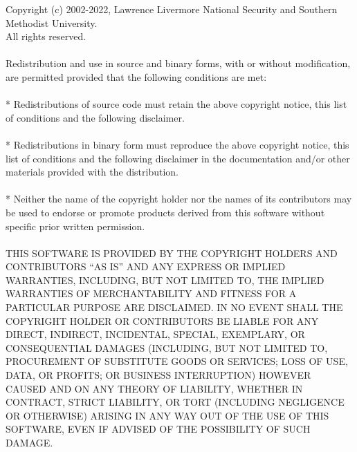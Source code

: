 Copyright (c) 2002-2022, Lawrence Livermore National Security and Southern
Methodist University.\\
All rights reserved.
\\
\\
Redistribution and use in source and binary forms, with or without
modification, are permitted provided that the following conditions are met:
\\
\\
* Redistributions of source code must retain the above copyright notice, this
  list of conditions and the following disclaimer.
\\
\\
* Redistributions in binary form must reproduce the above copyright notice,
  this list of conditions and the following disclaimer in the documentation
  and/or other materials provided with the distribution.
\\
\\
* Neither the name of the copyright holder nor the names of its
  contributors may be used to endorse or promote products derived from
  this software without specific prior written permission.
\\
\\
THIS SOFTWARE IS PROVIDED BY THE COPYRIGHT HOLDERS AND CONTRIBUTORS ``AS IS''
AND ANY EXPRESS OR IMPLIED WARRANTIES, INCLUDING, BUT NOT LIMITED TO, THE
IMPLIED WARRANTIES OF MERCHANTABILITY AND FITNESS FOR A PARTICULAR PURPOSE ARE
DISCLAIMED. IN NO EVENT SHALL THE COPYRIGHT HOLDER OR CONTRIBUTORS BE LIABLE
FOR ANY DIRECT, INDIRECT, INCIDENTAL, SPECIAL, EXEMPLARY, OR CONSEQUENTIAL
DAMAGES (INCLUDING, BUT NOT LIMITED TO, PROCUREMENT OF SUBSTITUTE GOODS OR
SERVICES; LOSS OF USE, DATA, OR PROFITS; OR BUSINESS INTERRUPTION) HOWEVER
CAUSED AND ON ANY THEORY OF LIABILITY, WHETHER IN CONTRACT, STRICT LIABILITY,
OR TORT (INCLUDING NEGLIGENCE OR OTHERWISE) ARISING IN ANY WAY OUT OF THE USE
OF THIS SOFTWARE, EVEN IF ADVISED OF THE POSSIBILITY OF SUCH DAMAGE.

